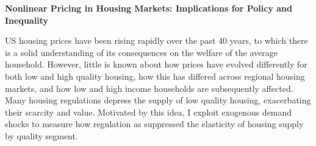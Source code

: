 \documentclass[11pt]{amsart}
\begin{document}
\bigskip
\begin{center}
\LARGE
\textbf{Nonlinear Pricing in Housing Markets: Implications for Policy and Inequality }\\
\large
\normalsize
\end{center}
US housing prices have been rising rapidly over the past 40 years, to which there is a solid understanding of its consequences on the welfare of the average household. However, little is known about how prices have evolved differently for both low and high quality housing, how this has differed across regional housing markets, and how low and high income households are subsequently affected. Many housing regulations depress the supply of low quality housing, exacerbating their scarcity and value. Motivated by this idea, I exploit exogenous demand shocks to measure how regulation as suppressed the elasticity of housing supply by quality segment.  \\
\end{document}
